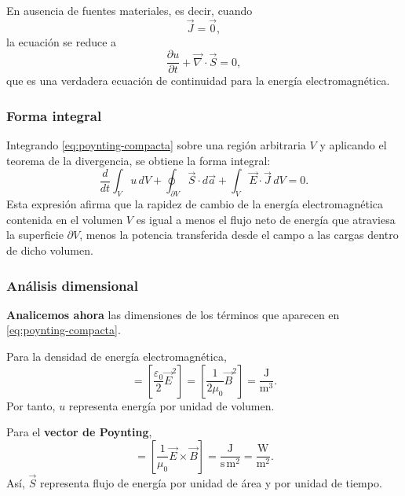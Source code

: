 \documentclass[12pt,a4paper]{article}
\theoremstyle{definition}
\theoremstyle{plain}
\numberwithin{equation}{section}
\theoremstyle{remark}
\newcommand{\E}{\vec{E}}
\newcommand{\B}{\vec{B}}
\newcommand{\J}{\vec{J}}
\begin{document}
En ausencia de fuentes materiales, es decir, cuando
\begin{equation*}
    \J=\vec 0,
\end{equation*}
la ecuación se reduce a
\begin{equation*}
    \frac{\partial u}{\partial t}+\vec\nabla\cdot\vec S=0,
\end{equation*}
que es una verdadera ecuación de continuidad para la energía electromagnética.

\subsubsection*{Forma integral}

Integrando \eqref{eq:poynting-compacta} sobre una región arbitraria $V$ y aplicando el teorema de la divergencia, se obtiene la forma integral:
\begin{equation*}
    \frac{d}{dt}\int_V u\,dV
    +
    \oint_{\partial V}\vec S\cdot d\vec a
    +
    \int_V \E\cdot\J\,dV=0.
\end{equation*}
Esta expresión afirma que la rapidez de cambio de la energía electromagnética contenida en el volumen $V$ es igual a menos el flujo neto de energía que atraviesa la superficie $\partial V$, menos la potencia transferida desde el campo a las cargas dentro de dicho volumen.

\subsubsection*{Análisis dimensional}

\textbf{Analicemos ahora} las dimensiones de los términos que aparecen en \eqref{eq:poynting-compacta}.

Para la densidad de energía electromagnética,
\begin{equation*}
    [u]
    =
    \left[\frac{\varepsilon_0}{2}\E^2\right]
    =
    \left[\frac{1}{2\mu_0}\B^2\right]
    =
    \frac{\mathrm{J}}{\mathrm{m}^3}.
\end{equation*}
Por tanto, $u$ representa energía por unidad de volumen.

Para el \textbf{vector de Poynting},
\begin{equation*}
    [\vec S]
    =
    \left[\frac{1}{\mu_0}\E\times\B\right]
    =
    \frac{\mathrm{J}}{\mathrm{s}\,\mathrm{m}^2}
    =
    \frac{\mathrm{W}}{\mathrm{m}^2}.
\end{equation*}
Así, $\vec S$ representa flujo de energía por unidad de área y por unidad de tiempo.
\end{document}
